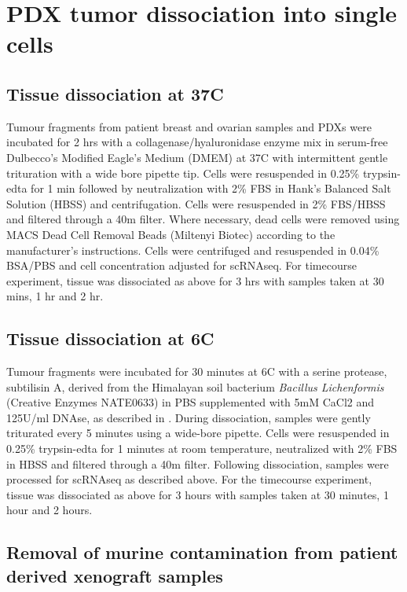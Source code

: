 \section{PDX tumor dissociation into single cells}

\subsection{Tissue dissociation at 37\textdegree C}
Tumour fragments from patient breast and ovarian samples and PDXs were incubated for 2 hrs with a collagenase/hyaluronidase enzyme mix in serum-free Dulbecco's Modified Eagle's Medium (DMEM) at 37\textdegree C with intermittent gentle trituration with a wide bore pipette tip. Cells were resuspended in 0.25\% trypsin-edta for 1 min followed by neutralization with 2\% FBS in Hank's Balanced Salt Solution (HBSS) and centrifugation. Cells were resuspended in 2\% FBS/HBSS and filtered through a 40\textmu m filter. Where necessary, dead cells were removed using MACS Dead Cell Removal Beads (Miltenyi Biotec) according to the manufacturer's instructions. Cells were centrifuged and resuspended in 0.04\%  BSA/PBS and cell concentration adjusted for scRNAseq. For timecourse experiment, tissue was dissociated as above for 3 hrs with samples taken at 30 mins, 1 hr and 2 hr.

\subsection{Tissue dissociation at 6\textdegree C}
Tumour fragments were incubated for 30 minutes at 6\textdegree C with a serine protease, subtilisin A, derived from the Himalayan soil bacterium \textit{Bacillus Lichenformis} (Creative Enzymes NATE0633) in PBS supplemented with 5mM CaCl2 and 125U/ml DNAse, as described in \cite{adam2017psychrophilic, potter2019dissociation}. During dissociation, samples were gently triturated every 5 minutes using a wide-bore pipette. Cells were resuspended in 0.25\% trypsin-edta for 1 minutes at room temperature, neutralized with 2\% FBS in HBSS and filtered through a 40\textmu m filter. Following dissociation, samples were processed for scRNAseq as described above. For the timecourse experiment, tissue was dissociated as above for 3 hours with samples taken at 30 minutes, 1 hour and 2 hours. 

\subsection{Removal of murine contamination from patient derived xenograft samples}

